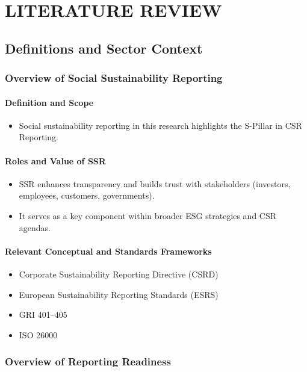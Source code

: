 \chapter{LITERATURE REVIEW}

\section{Definitions and Sector Context}

\subsection{Overview of Social Sustainability Reporting}

\subsubsection{Definition and Scope}
\begin{itemize}
    \item Social sustainability reporting in this research highlights the 
    S-Pillar in CSR Reporting. 
\end{itemize}

\subsubsection{Roles and Value of SSR}
\begin{itemize}
    \item SSR enhances transparency and builds trust with stakeholders (investors, employees, customers, governments). 
    \item It serves as a key component within broader ESG strategies and CSR agendas.
\end{itemize}

\subsubsection{Relevant Conceptual and Standards Frameworks}
\begin{itemize}
    \item Corporate Sustainability Reporting Directive (CSRD)
    \item European Sustainability Reporting Standards (ESRS)
    \item GRI 401--405
    \item ISO 26000
\end{itemize}

\subsection{Overview of Reporting Readiness}
